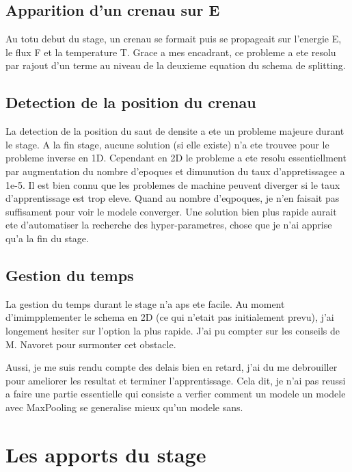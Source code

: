\subsection{Apparition d'un crenau sur E}
Au totu debut du stage, un crenau se formait puis se propageait sur l'energie E, le flux F et la temperature T. Grace a mes encadrant, ce probleme a ete resolu par rajout d'un terme au niveau de la deuxieme equation du schema de splitting.

\subsection{Detection de la position du crenau}
La detection de la position du saut de densite a ete un probleme majeure durant le stage. A la fin stage, aucune solution (si elle existe) n'a ete trouvee pour le probleme inverse en 1D. 
Cependant en 2D le probleme a ete resolu essentiellment par augmentation du nombre d'epoques et dimunution du taux d'appretissagee a 1e-5. Il est bien connu que les problemes de machine peuvent diverger si le taux d'apprentissage est trop eleve. Quand au nombre d'eqpoques, je n'en faisait pas suffisament pour voir le modele converger. Une solution bien plus rapide aurait ete d'automatiser la recherche des hyper-parametres, chose que je n'ai apprise qu'a la fin du stage.

\subsection{Gestion du temps}
La gestion du temps durant le stage n'a aps ete facile. Au moment d'imimpplementer le schema en 2D (ce qui n'etait pas initialement prevu), j'ai longement hesiter sur l'option la plus rapide. J'ai pu compter sur les conseils de M. Navoret pour surmonter cet obstacle. 

Aussi, je me suis rendu compte des delais bien en retard, j'ai du me debrouiller pour ameliorer les resultat et terminer l'apprentissage. Cela dit, je n'ai pas reussi a faire une partie essentielle qui consiste a verfier comment un modele un modele avec MaxPooling se generalise mieux qu'un modele sans.


\section{Les apports du stage}


